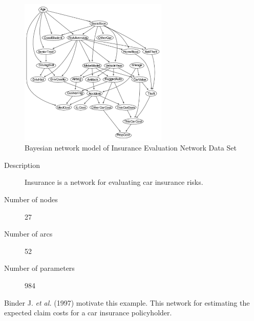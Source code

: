 	\begin{figure}[h]
	\centering
		\includegraphics[height=200pt]{images/Real_Insurance}
		\caption{Bayesian network model of Insurance Evaluation Network Data Set}
	\end{figure}	

\begin{description}
	\item[Description] Insurance is a network for evaluating car insurance risks.

	\item[Number of nodes] 27
	
	\item[Number of arcs] 52
	
	\item[Number of parameters] 984
\end{description}

Binder J. \emph{et al.} (1997) motivate this example. This network for estimating the expected claim costs for a car insurance policyholder.


